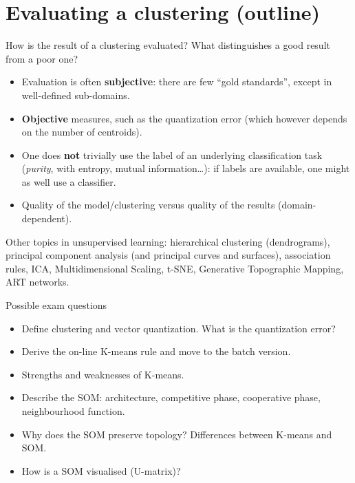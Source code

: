 \section{Evaluating a clustering
(outline)}\label{valutare-un-clustering-cenni}

How is the result of a clustering evaluated? What distinguishes a good
result from a poor one?

\begin{itemize}
\tightlist
\item
  Evaluation is often \textbf{subjective}: there are few ``gold
  standards'', except in well-defined sub-domains.
\item
  \textbf{Objective} measures, such as the quantization error (which
  however depends on the number of centroids).
\item
  One does \textbf{not} trivially use the label of an underlying
  classification task (\emph{purity}, with entropy, mutual
  information\ldots): if labels are available, one might as well use a
  classifier.
\item
  Quality of the model/clustering versus quality of the results
  (domain-dependent).
\end{itemize}

Other topics in unsupervised learning: hierarchical clustering
(dendrograms), principal component analysis (and principal curves and
surfaces), association rules, ICA, Multidimensional Scaling, t-SNE,
Generative Topographic Mapping, ART networks.

\begin{boxquestion}{Possible exam questions}

\begin{itemize}
\tightlist
\item
  Define clustering and vector quantization. What is the quantization
  error?
\item
  Derive the on-line K-means rule and move to the batch version.
\item
  Strengths and weaknesses of K-means.
\item
  Describe the SOM: architecture, competitive phase, cooperative phase,
  neighbourhood function.
\item
  Why does the SOM preserve topology? Differences between K-means and
  SOM.
\item
  How is a SOM visualised (U-matrix)?
\end{itemize}

\end{boxquestion}
